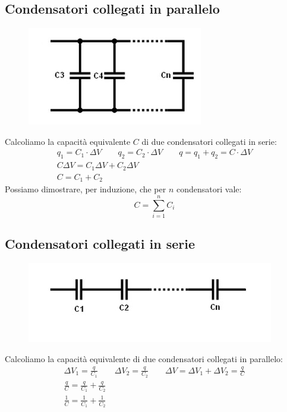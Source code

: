 \subsection{Condensatori collegati in parallelo}
\begin{figure}
	\centering
    \includegraphics[scale = 0.7]{condensatori-parallelo}
\end{figure}
Calcoliamo la capacità equivalente $C$ di due condensatori collegati in serie:
\begin{displaymath}\begin{aligned}
	q_1 = C_1 \cdot \Delta V \qquad q_2 = C_2 \cdot \Delta V \qquad q = q_1 + q_2 = C \cdot \Delta V\\
    C \Delta V = C_1 \Delta V + C_2 \Delta V\\
    C = C_1 + C_2
\end{aligned}\end{displaymath}
Possiamo dimostrare, per induzione, che per $n$ condensatori vale:
\begin{displaymath}
	C = \sum_{i=1}^n C_i
\end{displaymath}

\subsection{Condensatori collegati in serie}
\begin{figure}[h!]
	\centering
    \includegraphics[scale = 0.8]{condensatori-serie}
\end{figure}
Calcoliamo la capacità equivalente di due condensatori collegati in parallelo:
\begin{displaymath}\begin{aligned}
	\Delta V_1 = \frac{q}{C_1} \qquad \Delta V_2 = \frac{q}{C_2} \qquad
    \Delta V = \Delta V_1 + \Delta V_2 = \frac{q}{C}\\
    \frac{q}{C} = \frac{q}{C_1} + \frac{q}{C_2}\\
    \frac{1}{C} = \frac{1}{C_1} + \frac{1}{C_2}
\end{aligned}\end{displaymath}

